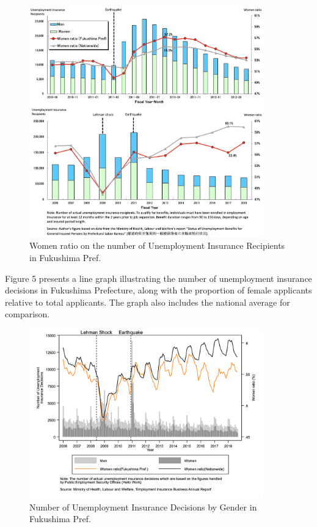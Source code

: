 \documentclass[12pt,halfline,a4paper]{ouparticle}
\begin{document}
\begin{figure}[h!]
    \centering
    \includegraphics[width=0.9\textwidth]{Number of Actual Unemployment Insurance Recipients2.jpeg}  %
    \caption{Women ratio on the number of Unemployment Insurance Recipients in Fukushima Pref.}
    \label{fig:women_ratio_fukushima}
\end{figure}

\newpage

Figure 5 presents a line graph illustrating the number of unemployment insurance decisions in Fukushima Prefecture, along with the proportion of female applicants relative to total applicants. The graph also includes the national average for comparison. 

\begin{figure}[h!]
    \centering
    \includegraphics[width=0.9\textwidth]{Number of Unemployment Insurance decisions.jpg}  %
    \caption{Number of Unemployment Insurance Decisions by Gender in Fukushima Pref.}
    \label{fig:employment_insurance_decisions}
\end{figure}
\end{document}
